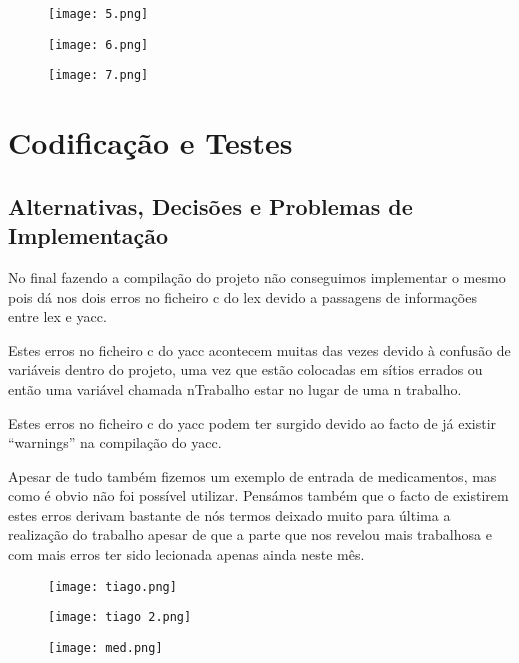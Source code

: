 \documentclass{report}
\begin{document}
\begin{figure}
    \centering
    \texttt{[image: 5.png]}
\end{figure}


\begin{figure}
    \centering
    \texttt{[image: 6.png]}
\end{figure}


\begin{figure}
    \centering
    \texttt{[image: 7.png]}
\end{figure}

\chapter{Codificação e Testes}
\section{Alternativas, Decisões e Problemas de Implementação}
No final fazendo a compilação do projeto não conseguimos implementar 
o mesmo pois dá nos dois erros no ficheiro c do lex devido a passagens 
de informações entre lex e yacc.

Estes erros no ficheiro c do yacc acontecem muitas das vezes
devido à confusão de variáveis dentro do projeto, 
uma vez que estão colocadas em sítios errados ou então uma variável chamada 
nTrabalho estar no lugar de uma n trabalho.

Estes erros no ficheiro c do yacc podem ter surgido devido 
ao facto de já existir “warnings” na compilação do yacc.

Apesar de tudo também fizemos um exemplo de entrada de medicamentos, mas 
como é obvio não foi possível utilizar. Pensámos também que o facto de existirem 
estes erros derivam bastante de nós termos deixado muito para última a realização 
do trabalho apesar de que a parte que nos revelou mais trabalhosa e com mais erros 
ter sido lecionada apenas ainda neste mês.

\begin{figure}
    \centering
    \texttt{[image: tiago.png]}
\end{figure}

\begin{figure}
    \centering
    \texttt{[image: tiago 2.png]}
\end{figure}

\begin{figure}
    \centering
    \texttt{[image: med.png]}
\end{figure}
\end{document}
